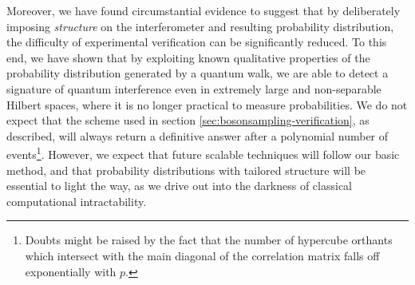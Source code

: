 Moreover, we have found circumstantial evidence to suggest that by deliberately imposing \emph{structure} on the interferometer and resulting probability distribution, the difficulty of experimental verification can be significantly reduced. To this end, we have shown that by exploiting known qualitative properties of the probability distribution generated by a quantum walk, we are able to detect a signature of quantum interference even in extremely large and non-separable Hilbert spaces, where it is no longer practical to measure probabilities. We do not expect that the scheme used in section \ref{sec:bosonsampling-verification}, as described, will always return a definitive answer after a polynomial number of events\footnote{Doubts might be raised by the fact that the number of hypercube orthants which intersect with the main diagonal of the correlation matrix falls off exponentially with $p$.}. However, we expect that future scalable techniques will follow our basic method, and that probability distributions with tailored structure will be essential to light the way, as we drive out into the darkness of classical computational intractability.

